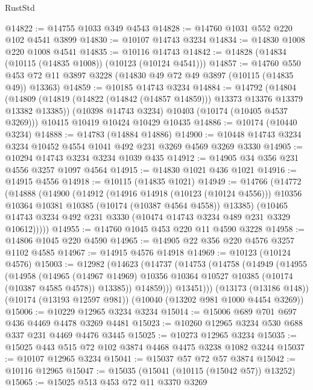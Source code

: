 \begin{lexlean}{RustStd}
\begin{coremodule}
@14822 := @14755 @1033 @349 @4543
@14828 := @14760 @1031 @552 @220 @102 @4541 @3899
@14830 := @10107 @14743 @3234
@14834 := @14830 @1008 @220 @1008 @4541
@14835 := @10116 @14743
@14842 := @14828 (@14834 (@10115 (@14835 @1008)) (@10123 (@10124 @4541)))
@14857 := @14760
    @550
    @453
    @72
    @11
    @3897
    @3228
    (@14830 @49 @72 @49 @3897 (@10115 (@14835 @49)) @13363)
@14859 := @10185 @14743 @3234
@14884 := @14792
    (@14804
      (@14809 (@14819 (@14822 (@14842 (@14857 @14859))) @13373 @13376 @13379 @13382 @13385))
      (@10398 @14743 @3234)
      @10403
      (@10174 (@10405 @4537 @3269)))
    @10415
    @10419
    @10424
    @10429
    @10435
@14886 := @10174 (@10440 @3234)
@14888 := @14783 (@14884 @14886)
@14900 := @10448 @14743 @3234 @3234 @10452 @4554 @1041 @492 @231 @3269 @4569 @3269 @3330
@14905 := @10294 @14743 @3234 @3234 @1039 @435
@14912 := @14905 @34 @356 @231 @4556 @3257 @1097 @4564
@14915 := @14830 @1021 @436 @1021
@14916 := @14915 @4556
@14918 := @10115 (@14835 @1021)
@14949 := @14766
    (@14772
      (@14888
        (@14900
          (@14912
            (@14916 @14918 (@10123 (@10124 @4556)))
            @10356
            @10364
            @10381
            @10385
            (@10174 (@10387 @4564 @4558))
            @13385)
          (@10465 @14743 @3234 @492 @231 @3330 (@10474 @14743 @3234 @489 @231 @3329 @10612)))))
@14955 := @14760 @1045 @453 @220 @11 @4590 @3228
@14958 := @14806 @1045 @220 @4590
@14965 := @14905 @22 @356 @220 @4576 @3257 @1102 @4585
@14967 := @14915 @4576 @14918
@14969 := @10123 (@10124 @4576)
@15003 := @12982
    (@14623
      (@14737
        (@14753
          (@14758
            (@14949
              (@14955
                (@14958
                  (@14965
                    (@14967 @14969)
                    @10356
                    @10364
                    @10527
                    @10385
                    (@10174 (@10387 @4585 @4578))
                    @13385))
                @14859)))
          @13451)))
    (@13173 (@13186 @148))
    (@10174 (@13193 @12597 @981))
    (@10040 (@13202 @981 @1000 @4454 @3269))
@15006 := @10229 @12965 @3234 @3234
@15014 := @15006 @689 @701 @697 @436 @4469 @4478 @3269 @4481
@15023 := @10260 @12965 @3234 @530 @688 @337 @231 @4469 @4476 @3445
@15025 := @10273 @12965 @3234
@15035 := @15025 @443 @515 @72 @102 @3874 @4468 @4475 @3238 @1082 @3244
@15037 := @10107 @12965 @3234
@15041 := @15037 @57 @72 @57 @3874
@15042 := @10116 @12965
@15047 := @15035 (@15041 (@10115 (@15042 @57)) @13252)
@15065 := @15025
    @513
    @453
    @72
    @11
    @3370
    @3269

\end{coremodule}
\end{lexlean}
